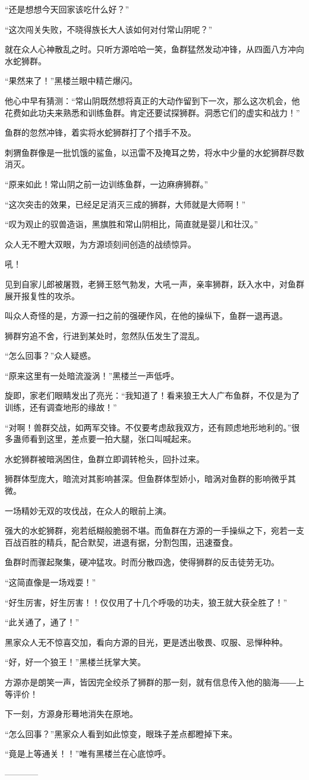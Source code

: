 \begin{this_body}
“还是想想今天回家该吃什么好？”

“这次闯关失败，不晓得族长大人该如何对付常山阴呢？”

就在众人心神散乱之时。只听方源哈哈一笑，鱼群猛然发动冲锋，从四面八方冲向水蛇狮群。

“果然来了！”黑楼兰眼中精芒爆闪。

他心中早有猜测：“常山阴既然想将真正的大动作留到下一次，那么这次机会，他花费如此功夫来熟悉和训练鱼群。肯定还要试探狮群。洞悉它们的虚实和战力！”

鱼群的忽然冲锋，着实将水蛇狮群打了个措手不及。

刺猬鱼群像是一批饥饿的鲨鱼，以迅雷不及掩耳之势，将水中少量的水蛇狮群尽数消灭。

“原来如此！常山阴之前一边训练鱼群，一边麻痹狮群。”

“这次突击的效果，已经足足消灭三成的狮群，大师就是大师啊！”

“叹为观止的驭兽造诣，黑旗胜和常山阴相比，简直就是婴儿和壮汉。”

众人无不瞪大双眼，为方源顷刻间创造的战绩惊异。

吼！

见到自家儿郎被屠戮，老狮王怒气勃发，大吼一声，亲率狮群，跃入水中，对鱼群展开报复性的攻杀。

叫众人奇怪的是，方源一扫之前的强硬作风，在他的操纵下，鱼群一退再退。

狮群穷追不舍，行进到某处时，忽然队伍发生了混乱。

“怎么回事？”众人疑惑。

“原来这里有一处暗流漩涡！”黑楼兰一声低呼。

旋即，家老们眼睛发出了亮光：“我知道了！看来狼王大人广布鱼群，不仅是为了训练，还有调查地形的缘故！”

“对啊！兽群交战，如两军交锋。不仅要考虑敌我双方，还有顾虑地形地利的。”很多蛊师看到这里，差点要一拍大腿，张口叫喊起来。

水蛇狮群被暗涡困住，鱼群立即调转枪头，回扑过来。

狮群体型庞大，暗流对其影响甚深。但鱼群体型娇小，暗涡对鱼群的影响微乎其微。

一场精妙无双的攻伐战，在众人的眼前上演。

强大的水蛇狮群，宛若纸糊般脆弱不堪。而鱼群在方源的一手操纵之下，宛若一支百战百胜的精兵，配合默契，进退有据，分割包围，迅速蚕食。

鱼群时而骤起聚集，硬冲猛攻。时而分散四逸，使得狮群的反击徒劳无功。

“这简直像是一场戏耍！”

“好生厉害，好生厉害！！仅仅用了十几个呼吸的功夫，狼王就大获全胜了！”

“此关通了，通了！”

黑家众人无不惊喜交加，看向方源的目光，更是透出敬畏、叹服、忌惮种种。

“好，好一个狼王！”黑楼兰抚掌大笑。

方源亦是朗笑一声，皆因完全绞杀了狮群的那一刻，就有信息传入他的脑海――上等评价！

下一刻，方源身形蓦地消失在原地。

“怎么回事？”黑家众人看到如此惊变，眼珠子差点都瞪掉下来。

“竟是上等通关！！”唯有黑楼兰在心底惊呼。

------------

\end{this_body}

